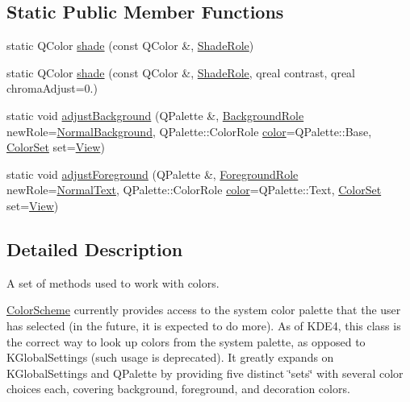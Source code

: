 \subsection*{Static Public Member Functions}
\begin{DoxyCompactItemize}
\item 
static Q\+Color \hyperlink{class_color_scheme_a653acbdf70807b7d59cc097f74321c12}{shade} (const Q\+Color \&, \hyperlink{class_color_scheme_a666c52f132343e360756a126d558cdd6}{Shade\+Role})
\item 
static Q\+Color \hyperlink{class_color_scheme_a0b9ddff11e4879c7a99c1a9f63e0877e}{shade} (const Q\+Color \&, \hyperlink{class_color_scheme_a666c52f132343e360756a126d558cdd6}{Shade\+Role}, qreal contrast, qreal chroma\+Adjust=0.)
\item 
static void \hyperlink{class_color_scheme_a6f5d2968152d0d1f76c1e6720c185850}{adjust\+Background} (Q\+Palette \&, \hyperlink{class_color_scheme_a70715e73df1fb0f140797633f8043a8c}{Background\+Role} new\+Role=\hyperlink{class_color_scheme_a70715e73df1fb0f140797633f8043a8ca9762dd3095372ba69df3c550d96af844}{Normal\+Background}, Q\+Palette\+::\+Color\+Role \hyperlink{structcolor}{color}=Q\+Palette\+::\+Base, \hyperlink{class_color_scheme_a56ea451e86dffa1822ed087902844e05}{Color\+Set} set=\hyperlink{class_color_scheme_a56ea451e86dffa1822ed087902844e05a45150fc89ebfd98918cb57ecae48f7c8}{View})
\item 
static void \hyperlink{class_color_scheme_a3d2585cb284a9c5efa5c82feb9499251}{adjust\+Foreground} (Q\+Palette \&, \hyperlink{class_color_scheme_ab0f331e829838e82757088db8ce32ab4}{Foreground\+Role} new\+Role=\hyperlink{class_color_scheme_ab0f331e829838e82757088db8ce32ab4a8372236563517a7e3ec2d7af791eef12}{Normal\+Text}, Q\+Palette\+::\+Color\+Role \hyperlink{structcolor}{color}=Q\+Palette\+::\+Text, \hyperlink{class_color_scheme_a56ea451e86dffa1822ed087902844e05}{Color\+Set} set=\hyperlink{class_color_scheme_a56ea451e86dffa1822ed087902844e05a45150fc89ebfd98918cb57ecae48f7c8}{View})
\end{DoxyCompactItemize}


\subsection{Detailed Description}
A set of methods used to work with colors.

\hyperlink{class_color_scheme}{Color\+Scheme} currently provides access to the system color palette that the user has selected (in the future, it is expected to do more). As of K\+D\+E4, this class is the correct way to look up colors from the system palette, as opposed to K\+Global\+Settings (such usage is deprecated). It greatly expands on K\+Global\+Settings and Q\+Palette by providing five distinct \char`\"{}sets\char`\"{} with several color choices each, covering background, foreground, and decoration colors.

